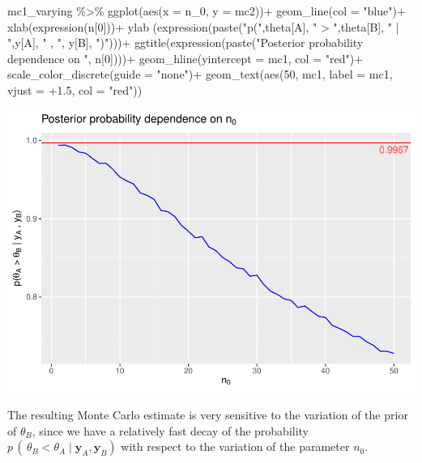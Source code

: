 \documentclass[
  11pt,
]{article}
\newenvironment{Shaded}{\begin{snugshade}}{\end{snugshade}}
\newcommand{\AttributeTok}[1]{\textcolor[rgb]{0.77,0.63,0.00}{#1}}
\newcommand{\DecValTok}[1]{\textcolor[rgb]{0.00,0.00,0.81}{#1}}
\newcommand{\FloatTok}[1]{\textcolor[rgb]{0.00,0.00,0.81}{#1}}
\newcommand{\FunctionTok}[1]{\textcolor[rgb]{0.00,0.00,0.00}{#1}}
\newcommand{\NormalTok}[1]{#1}
\newcommand{\SpecialCharTok}[1]{\textcolor[rgb]{0.00,0.00,0.00}{#1}}
\newcommand{\StringTok}[1]{\textcolor[rgb]{0.31,0.60,0.02}{#1}}
\begin{document}
\begin{Shaded}
\begin{Highlighting}[]
\NormalTok{mc1\_varying }\SpecialCharTok{\%\textgreater{}\%} \FunctionTok{ggplot}\NormalTok{(}\FunctionTok{aes}\NormalTok{(}\AttributeTok{x =}\NormalTok{ n\_0, }\AttributeTok{y =}\NormalTok{ mc2))}\SpecialCharTok{+}
  \FunctionTok{geom\_line}\NormalTok{(}\AttributeTok{col =} \StringTok{"blue"}\NormalTok{)}\SpecialCharTok{+}
  \FunctionTok{xlab}\NormalTok{(}\FunctionTok{expression}\NormalTok{(n[}\DecValTok{0}\NormalTok{]))}\SpecialCharTok{+}
  \FunctionTok{ylab}\NormalTok{ (}\FunctionTok{expression}\NormalTok{(}\FunctionTok{paste}\NormalTok{(}\StringTok{"p("}\NormalTok{,theta[A], }\StringTok{" \textgreater{} "}\NormalTok{,theta[B], }\StringTok{" | "}\NormalTok{,y[A], }\StringTok{" , "}\NormalTok{, y[B], }\StringTok{")"}\NormalTok{)))}\SpecialCharTok{+}
  \FunctionTok{ggtitle}\NormalTok{(}\FunctionTok{expression}\NormalTok{(}\FunctionTok{paste}\NormalTok{(}\StringTok{"Posterior probability dependence on "}\NormalTok{, n[}\DecValTok{0}\NormalTok{])))}\SpecialCharTok{+}
  \FunctionTok{geom\_hline}\NormalTok{(}\AttributeTok{yintercept =}\NormalTok{ mc1, }\AttributeTok{col =} \StringTok{"red"}\NormalTok{)}\SpecialCharTok{+}
  \FunctionTok{scale\_color\_discrete}\NormalTok{(}\AttributeTok{guide =} \StringTok{"none"}\NormalTok{)}\SpecialCharTok{+}
  \FunctionTok{geom\_text}\NormalTok{(}\FunctionTok{aes}\NormalTok{(}\DecValTok{50}\NormalTok{, mc1, }\AttributeTok{label =}\NormalTok{ mc1, }\AttributeTok{vjust =} \SpecialCharTok{+}\FloatTok{1.5}\NormalTok{, }\AttributeTok{col =} \StringTok{"red"}\NormalTok{))}
\end{Highlighting}
\end{Shaded}

\begin{center}\includegraphics[width=0.6\linewidth]{1_hw_bs_code_files/figure-latex/unnamed-chunk-5-1} \end{center}
\normalsize

The resulting Monte Carlo estimate is very sensitive to the variation of
the prior of \(\theta_B\), since we have a relatively fast decay of the
probability
\(p \,( \, \theta_B < \theta_A \; | \; \mathbf{y}_A, \mathbf{y}_B)\)
with respect to the variation of the parameter \(n_0\).
\end{document}
